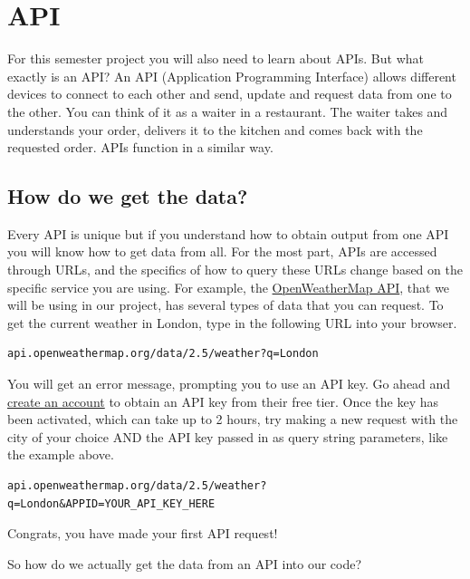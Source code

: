 \documentclass[
]{book}
\begin{document}
\hypertarget{api}{%
\section{API}\label{api}}

For this semester project you will also need to learn about APIs. But what exactly is an API? An API (Application Programming Interface) allows different devices to connect to each other and send, update and request data from one to the other. You can think of it as a waiter in a restaurant. The waiter takes and understands your order, delivers it to the kitchen and comes back with the requested order. APIs function in a similar way.

\hypertarget{how-do-we-get-the-data}{%
\subsection*{How do we get the data?}\label{how-do-we-get-the-data}}

Every API is unique but if you understand how to obtain output from one API you will know how to get data from all.
For the most part, APIs are accessed through URLs, and the specifics of how to query these URLs change based on the specific service you are using. For example, the \href{https://openweathermap.org/api}{OpenWeatherMap API}, that we will be using in our project, has several types of data that you can request. To get the current weather in London, type in the following URL into your browser.

\begin{verbatim}
api.openweathermap.org/data/2.5/weather?q=London
\end{verbatim}

You will get an error message, prompting you to use an API key. Go ahead and \href{https://home.openweathermap.org/users/sign_up}{create an account} to obtain an API key from their free tier. Once the key has been activated, which can take up to 2 hours, try making a new request with the city of your choice AND the API key passed in as query string parameters, like the example above.

\begin{verbatim}
api.openweathermap.org/data/2.5/weather?q=London&APPID=YOUR_API_KEY_HERE
\end{verbatim}

Congrats, you have made your first API request!

So how do we actually get the data from an API into our code?
\end{document}
